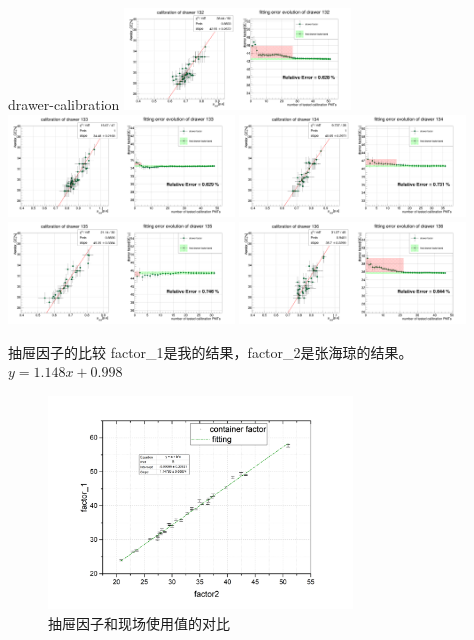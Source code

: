 \documentclass[11pt,compress,xcolor=x11names,UTF8]{beamer}
\begin{document}
\begin{frame}{drawer-calibration}
\vspace{-.5cm}
\includegraphics[width=0.45\textwidth]{sta101-30} 
\includegraphics[width=0.45\textwidth]{sta101-31} 
\includegraphics[width=0.45\textwidth]{sta101-32} 
\includegraphics[width=0.45\textwidth]{sta101-33} 
\includegraphics[width=0.45\textwidth]{sta101-34} 
\end{frame}
\begin{frame}{抽屉因子的比较}
factor\_1是我的结果，factor\_2是张海琼的结果。$y=1.148x+0.998$
\vspace{-.05cm}
\begin{figure}
\includegraphics[width=0.72\textwidth]{drawerfactors} 
\caption{抽屉因子和现场使用值的对比}
\end{figure}
\end{frame}
\end{document}
